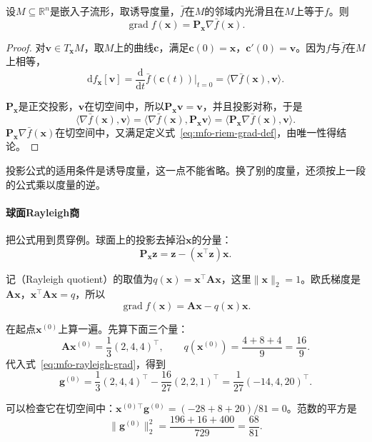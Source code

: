 \begin{lemma}[投影公式]
 \label{lem:mfo-projection-gradient}
 设$M\subseteq\mathbb{R}^n$是嵌入子流形，取诱导度量，$\bar{f}$在$M$的邻域内光滑且在$M$上等于$f$。则
 \begin{equation}
  \operatorname{grad}f(\bm{x})=\bm{P}_{\bm{x}}\nabla\bar{f}(\bm{x}).
  \label{eq:mfo-projection-gradient}
 \end{equation}
\end{lemma}

\begin{proof}
 对$\bm{v}\in T_{\bm{x}}M$，取$M$上的曲线$\bm{c}$，满足$\bm{c}(0)=\bm{x}$，$\bm{c}'(0)=\bm{v}$。因为$f$与$\bar{f}$在$M$上相等，
 \[
  \mathrm{d}f_{\bm{x}}[\bm{v}]=\frac{\mathrm{d}}{\mathrm{d}t}\bar{f}(\bm{c}(t))\Big|_{t=0}=\langle\nabla\bar{f}(\bm{x}),\bm{v}\rangle.
 \]

 $\bm{P}_{\bm{x}}$是正交投影，$\bm{v}$在切空间中，所以$\bm{P}_{\bm{x}}\bm{v}=\bm{v}$，并且投影对称，于是
 \[
  \langle\nabla\bar{f}(\bm{x}),\bm{v}\rangle=\langle\nabla\bar{f}(\bm{x}),\bm{P}_{\bm{x}}\bm{v}\rangle=\langle\bm{P}_{\bm{x}}\nabla\bar{f}(\bm{x}),\bm{v}\rangle.
 \]
 $\bm{P}_{\bm{x}}\nabla\bar{f}(\bm{x})$在切空间中，又满足定义式~\eqref{eq:mfo-riem-grad-def}，由唯一性得结论。
\end{proof}

投影公式的适用条件是诱导度量，这一点不能省略。换了别的度量，还须按上一段的公式乘以度量的逆。

\paragraph{球面Rayleigh商}
把公式用到贯穿例。球面上的投影去掉沿$\bm{x}$的分量：
\[
 \bm{P}_{\bm{x}}\bm{z}=\bm{z}-(\bm{x}^\top\bm{z})\bm{x}.
\]

记（Rayleigh quotient）的取值为$q(\bm{x})=\bm{x}^\top\bm{A}\bm{x}$，这里$\lVert\bm{x}\rVert_2=1$。欧氏梯度是$\bm{A}\bm{x}$，$\bm{x}^\top\bm{A}\bm{x}=q$，所以
\begin{equation}
 \operatorname{grad}f(\bm{x})=\bm{A}\bm{x}-q(\bm{x})\bm{x}.
 \label{eq:mfo-rayleigh-grad}
\end{equation}

在起点$\bm{x}^{(0)}$上算一遍。先算下面三个量：
\[
 \bm{A}\bm{x}^{(0)}=\frac13(2,4,4)^\top,\qquad q(\bm{x}^{(0)})=\frac{4+8+4}{9}=\frac{16}{9}.
\]
代入式~\eqref{eq:mfo-rayleigh-grad}，得到
\[
 \bm{g}^{(0)}=\frac13(2,4,4)^\top-\frac{16}{27}(2,2,1)^\top=\frac{1}{27}(-14,4,20)^\top.
\]

可以检查它在切空间中：$\bm{x}^{(0)\top}\bm{g}^{(0)}=(-28+8+20)/81=0$。范数的平方是
\[
 \lVert\bm{g}^{(0)}\rVert_2^2=\frac{196+16+400}{729}=\frac{68}{81}.
\]


